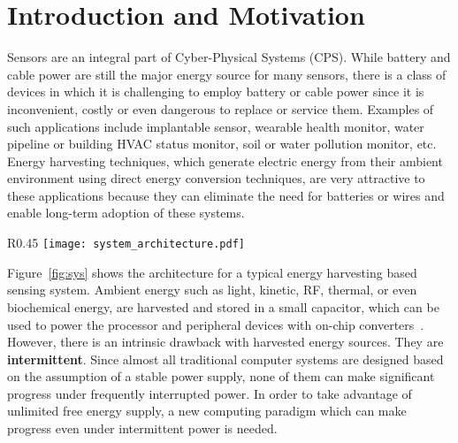 
\setcounter{section}{0}
\setcounter{figure}{0}
\graphicspath{{./figs/}{./figs/item-jingtong/}}


\section{Introduction and Motivation}

Sensors are an integral part of Cyber-Physical Systems (CPS).  
While battery and cable power are still the major energy source for many sensors, there is a class of devices in which it is challenging to employ battery or cable power since it is inconvenient, costly or even dangerous to replace or service them. Examples of such applications include implantable sensor, wearable health monitor, water pipeline or building HVAC status monitor, soil or water pollution monitor, etc.
Energy harvesting techniques, which generate electric energy from their ambient environment using direct energy conversion techniques, are very attractive to these applications because they can eliminate
the need for batteries or wires and enable long-term adoption of these systems.

\begin{wrapfigure}{R}{0.45\linewidth} 
\vspace{-25pt}
\centering
\texttt{[image: system\_architecture.pdf]}
\vspace{-35pt}
\caption{Energy Harvesting System}
\label{fig:sys}
\vspace{-6pt}
\end{wrapfigure}

Figure~\ref{fig:sys} shows the architecture for a typical energy harvesting based sensing system.
Ambient energy such as light, kinetic, RF, thermal, or even biochemical energy, are harvested and stored in a small capacitor, which can be used to power the processor and peripheral devices with on-chip converters~\cite{Tida:2014:NTI:2686762.2637481}. However, there is an intrinsic drawback with harvested energy sources. They are \textbf{intermittent}. Since almost all traditional computer systems are designed based on the assumption of a stable power supply, none of them can make significant progress under frequently interrupted power. In order to take advantage of unlimited free energy supply, a new computing paradigm which can make progress even under intermittent power is needed.

